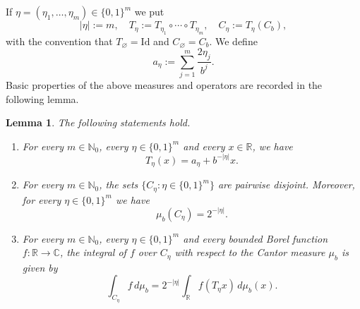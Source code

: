 \documentclass[reqno,a4paper,12pt]{amsart}
\newtheorem{lemma}[definition]{Lemma}
\def\N{{\mathbb N}}
\def\R{{\mathbb R}}
\def\C{{\mathbb C}}
\begin{document}
\subsection{}
If $\eta=(\eta_1,\ldots,\eta_m) \in \{0,1 \}^m$ we put
$$
        |\eta| :=m,\quad
        T_\eta := T_{\eta_1}\circ\cdots\circ T_{\eta_m},\quad
        C_\eta := T_\eta(C_b),
$$
with the convention that $T_\varnothing = \mathrm{Id}$ and $C_\varnothing=C_b$.
We define
$$
        a_\eta := \sum_{j=1}^{m}\frac{2\eta_j}{b^j}.
$$
Basic properties of the above measures and operators are recorded in the following lemma.
\begin{lemma}\label{prop:cantor-measure} The following statements hold.
\begin{enumerate}
    \item For every $m\in\N_0$, every $\eta\in\{0,1\}^m$ and every $x\in\R$, we have
\begin{equation}\label{eq:affine-cylinder}
        T_\eta(x)=a_\eta+b^{-|\eta|}x.
\end{equation}
\item For every $m \in \N_0 $, the sets $\{C_\eta:\eta\in\{0,1\}^m\}$ are pairwise disjoint. Moreover, for every $\eta\in\{0,1\}^m$ we have
\begin{equation}\label{eq:cylinder-mass-support}
        \mu_b(C_\eta)=2^{-|\eta|}.
\end{equation}
\item For every $m\in \N_0$, every $\eta\in\{0,1\}^m$ and every bounded
Borel function $f:\R\to\C$, the integral of $f$ over $C_\eta$ with respect to the Cantor measure $\mu_b$ is given by
\begin{equation}\label{eq:cylinder-integral}
        \int_{C_\eta}f\,d\mu_b
        =
        2^{-|\eta|}
        \int_{\R}f(T_\eta x)\,d\mu_b(x).
\end{equation}
\end{enumerate}
\end{lemma}
\end{document}
